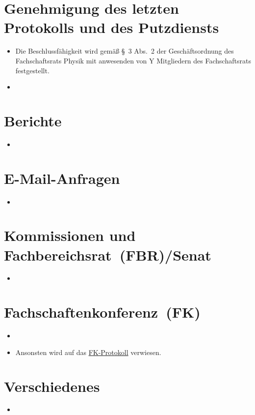 \documentclass[sitzung=fsr]{fsphys-protokoll}
\begin{document}
\section{Genehmigung des letzten Protokolls und des Putzdiensts}
\begin{itemize}
	\item Die Beschlussfähigkeit wird gemäß §~3 Abs.~2 der Geschäftsordnung des Fachschaftsrats Physik mit {\protokollanzahlanwesend} anwesenden von Y Mitgliedern des Fachschaftsrats festgestellt.
	\item 
\end{itemize}

\section{Berichte}
\begin{itemize}
	\item 
\end{itemize}

\section{E-Mail-Anfragen}
\begin{itemize}
	\item 
\end{itemize}

\section{Kommissionen und Fachbereichsrat~(FBR)/Senat}
\begin{itemize}
	\item 
\end{itemize}

\section{Fachschaftenkonferenz~(FK)}
\begin{itemize}
	\item 
	\item Ansonsten wird auf das \href{http://www.asta.ms/hochschulpolitik/hochschulpolitik/fachschaften/fk-protokolle}{FK-Protokoll} verwiesen.
\end{itemize}

\section{Verschiedenes}
\begin{itemize}
	\item 
\end{itemize}
\end{document}
